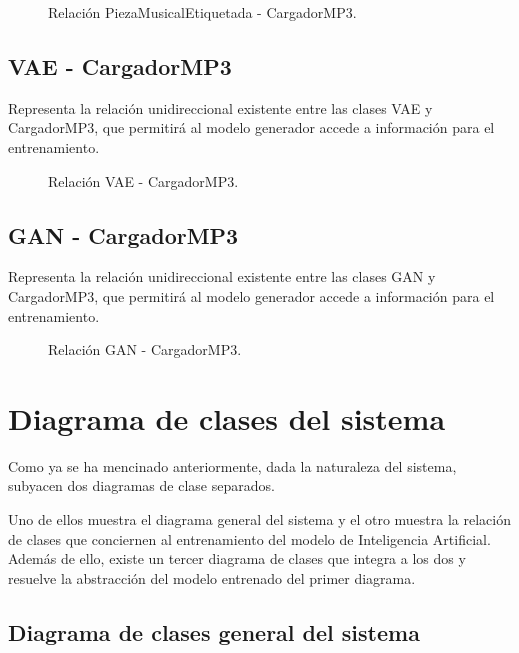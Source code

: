 \begin{figure}[H]
  \centering
  
  \caption{Relación PiezaMusicalEtiquetada - CargadorMP3.}
\end{figure}

\subsection{VAE - CargadorMP3}

Representa la relación unidireccional existente entre las clases VAE y CargadorMP3, que permitirá al modelo generador accede a información para el entrenamiento.

\begin{figure}[H]
  \centering
  
  \caption{Relación VAE - CargadorMP3.}
\end{figure}

\subsection{GAN - CargadorMP3}

Representa la relación unidireccional existente entre las clases GAN y CargadorMP3, que permitirá al modelo generador accede a información para el entrenamiento.

\begin{figure}[H]
  \centering
  
  \caption{Relación GAN - CargadorMP3.}
\end{figure}

\section{Diagrama de clases del sistema}

Como ya se ha mencinado anteriormente, dada la naturaleza del sistema, subyacen dos diagramas de clase separados.

Uno de ellos muestra el diagrama general del sistema y el otro muestra la relación de clases que conciernen al entrenamiento del modelo de Inteligencia Artificial. Además de ello, existe un tercer diagrama de clases que integra a los dos y resuelve la abstracción del modelo entrenado del primer diagrama.

\subsection{Diagrama de clases general del sistema}

